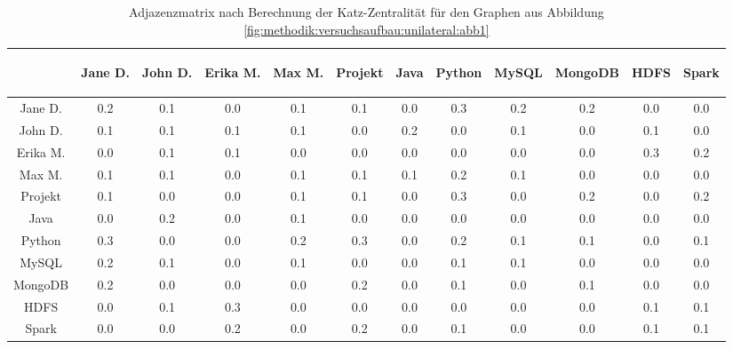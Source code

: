 \begin{table}[h]
	\centering
	\begin{tabular}{c|c|c|c|c|c|c|c|c|c|c|c}
		& \begin{sideways}Jane D.\end{sideways} & \begin{sideways}John D.\end{sideways} & \begin{sideways}Erika M.\end{sideways} & \begin{sideways}Max M.\end{sideways} & \begin{sideways}Projekt\end{sideways} & \begin{sideways}Java\end{sideways} & \begin{sideways}Python\end{sideways} & \begin{sideways}MySQL\end{sideways} & \begin{sideways}MongoDB\end{sideways} & \begin{sideways}HDFS\end{sideways} & \begin{sideways}Spark\end{sideways} \\
		\hline
		Jane D.  & 0.2 & 0.1 & 0.0 & 0.1 & 0.1 & 0.0 & 0.3 & 0.2 & 0.2 & 0.0 & 0.0\\
		John D.  & 0.1 & 0.1 & 0.1 & 0.1 & 0.0 & 0.2 & 0.0 & 0.1 & 0.0 & 0.1 & 0.0\\
		Erika M. & 0.0 & 0.1 & 0.1 & 0.0 & 0.0 & 0.0 & 0.0 & 0.0 & 0.0 & 0.3 & 0.2\\
		Max M.   & 0.1 & 0.1 & 0.0 & 0.1 & 0.1 & 0.1 & 0.2 & 0.1 & 0.0 & 0.0 & 0.0\\
		Projekt  & 0.1 & 0.0 & 0.0 & 0.1 & 0.1 & 0.0 & 0.3 & 0.0 & 0.2 & 0.0 & 0.2\\
		Java     & 0.0 & 0.2 & 0.0 & 0.1 & 0.0 & 0.0 & 0.0 & 0.0 & 0.0 & 0.0 & 0.0\\
		Python   & 0.3 & 0.0 & 0.0 & 0.2 & 0.3 & 0.0 & 0.2 & 0.1 & 0.1 & 0.0 & 0.1\\
		MySQL    & 0.2 & 0.1 & 0.0 & 0.1 & 0.0 & 0.0 & 0.1 & 0.1 & 0.0 & 0.0 & 0.0\\
		MongoDB  & 0.2 & 0.0 & 0.0 & 0.0 & 0.2 & 0.0 & 0.1 & 0.0 & 0.1 & 0.0 & 0.0\\
		HDFS     & 0.0 & 0.1 & 0.3 & 0.0 & 0.0 & 0.0 & 0.0 & 0.0 & 0.0 & 0.1 & 0.1\\
		Spark    & 0.0 & 0.0 & 0.2 & 0.0 & 0.2 & 0.0 & 0.1 & 0.0 & 0.0 & 0.1 & 0.1
	\end{tabular}
	\caption{Adjazenzmatrix nach Berechnung der Katz-Zentralität für den Graphen aus Abbildung \ref{fig:methodik:versuchsaufbau:unilateral:abb1}}
	\label{tbl:methodik:versuchsaufbau:unilateral:tbl1}
\end{table}

